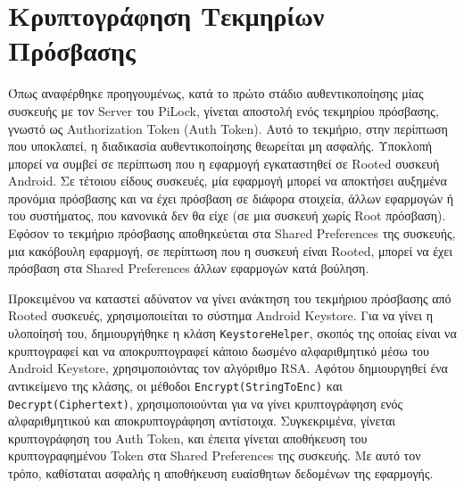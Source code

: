 \section{Κρυπτογράφηση Τεκμηρίων Πρόσβασης}
	Όπως αναφέρθηκε προηγουμένως, κατά το πρώτο στάδιο αυθεντικοποίησης μίας συσκευής με τον Server του PiLock, γίνεται αποστολή ενός τεκμηρίου πρόσβασης, γνωστό ως Authorization Token (Auth Token). Αυτό το τεκμήριο, στην περίπτωση που υποκλαπεί, η διαδικασία αυθεντικοποίησης θεωρείται μη ασφαλής. Υποκλοπή μπορεί να συμβεί σε περίπτωση που η εφαρμογή εγκαταστηθεί σε Rooted συσκευή Android. Σε τέτοιου είδους συσκευές, μία εφαρμογή μπορεί να αποκτήσει αυξημένα προνόμια πρόσβασης και να έχει πρόσβαση σε διάφορα στοιχεία, άλλων εφαρμογών ή του συστήματος, που κανονικά δεν θα είχε (σε μια συσκευή χωρίς Root πρόσβαση). Εφόσον το τεκμήριο πρόσβασης αποθηκεύεται στα Shared Preferences της συσκευής, μια κακόβουλη εφαρμογή, σε περίπτωση που η συσκευή είναι Rooted, μπορεί να έχει πρόσβαση στα Shared Preferences άλλων εφαρμογών κατά βούληση. 

	Προκειμένου να καταστεί αδύνατον να γίνει ανάκτηση του τεκμήριου πρόσβασης από Rooted συσκευές, χρησιμοποιείται το σύστημα Android Keystore. Για να γίνει η υλοποίησή του, δημιουργήθηκε η κλάση \verb|KeystoreHelper|, σκοπός της οποίας είναι να κρυπτογραφεί και να αποκρυπτογραφεί κάποιο δωσμένο αλφαριθμητικό μέσω του Android Keystore, χρησιμοποιόντας τον αλγόριθμο RSA. Αφότου δημιουργηθεί ένα αντικείμενο της κλάσης, οι μέθοδοι \verb|Encrypt(StringToEnc)| και \verb|Decrypt(Ciphertext)|, χρησιμοποιούνται για να γίνει κρυπτογράφηση ενός αλφαριθμητικού και αποκρυπτογράφηση αντίστοιχα. Συγκεκριμένα, γίνεται κρυπτογράφηση του Auth Token, και έπειτα γίνεται αποθήκευση του κρυπτογραφημένου Token στα Shared Preferences της συσκευής. Με αυτό τον τρόπο, καθίσταται ασφαλής η αποθήκευση ευαίσθητων δεδομένων της εφαρμογής.

